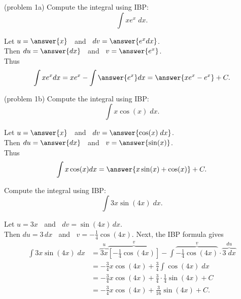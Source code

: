 \documentclass[handout]{ximera}
\begin{document}
\begin{problem}(problem 1a) %
  Compute the integral using IBP:
  \[
  \int xe^x \;dx.
  \]
  
  Let $u = \answer{x}\;\;$   and   $\;\; dv = \answer{e^x dx}$.\\
  Then $du = \answer{dx}\;\;$   and   $\;\; v = \answer{e^x}$.\\
  Thus 
  \[
  \int xe^x dx = xe^x - \int \answer{e^x} dx = \answer{xe^x - e^x} + C.
  \]
  


    

\end{problem}


\begin{problem}(problem 1b)
  Compute the integral using IBP:
  \[
  \int x\cos(x) \;dx.
  \]
  
  Let $u = \answer{x}\;\;$   and   $\;\;dv = \answer{\cos(x) \;dx}$.\\
  Then $du = \answer{dx}\;\;$   and   $\;\;v = \answer{\sin(x)}$.\\
  Thus 
  \[
  \int x\cos(x) dx = \answer{x\sin(x) + \cos(x)} + C.
  \]
  
  


    

\end{problem}


\begin{example}[example 2]
Compute the integral using IBP:
  \[
  \int 3x\sin(4x) \;dx.
  \]

Let $u = 3x\;\;$ and $\;\;dv = \sin(4x) \,dx$.\\
Then $du = 3 \,dx\;\;$ and $\;\; v = -\frac14 \cos(4x)$.
Next, the IBP formula gives
\begin{align*}
  \int 3x\sin(4x) \;dx &= \overbrace{3x}^{u}\overbrace{\left[-\frac14 \cos(4x)\right]}^{v} - \int \overbrace{-\frac14 \cos(4x)}^{v}  \cdot \overbrace{3 \; dx}^{du} \\
                       &= -\frac34 x\cos(4x) + \frac34 \int \cos(4x) \; dx \\
                       &= -\frac34 x\cos(4x) + \frac34 \cdot \frac 14 \sin(4x) + C\\
                       &= -\frac34 x\cos(4x) + \frac{3}{16}\sin(4x) + C.
\end{align*}

\end{example}
\end{document}
